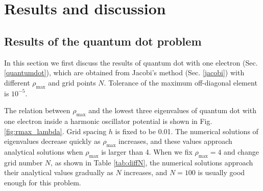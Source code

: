 \documentclass{article}
\begin{document}
	\section{Results and discussion}\label{results}
	\subsection{Results of the quantum dot problem}
In this section we first discuss the results of quantum dot with one electron (Sec. \ref{quantumdot}), 
which are obtained from Jacobi's method (Sec. \ref{jacobi}) with different $\rho_{\max}$ and grid points $N$. 
Tolerance of the maximum off-diagonal element is $10^{-5}$. 
\par
The relation between $\rho_{\max}$ and the lowest three eigenvalues of quantum dot with one electron inside a harmonic oscillator potential is shown in Fig. \ref{fig:rmax_lambda}. 
Grid spacing $h$ is fixed to be 0.01. 
The numerical solutions of eigenvalues decrease quickly as $\rho_{\max}$ increases, 
and these values approach analytical solutions when $\rho_{\max}$ is larger than 4. 
When we fix $\rho_{\max}=4$ and change grid number $N$, as shown in Table \ref{tab:diffN}, 
the numerical solutions approach their analytical values gradually as $N$ increases, 
and $N=100$ is usually good enough for this problem.  
\end{document}
